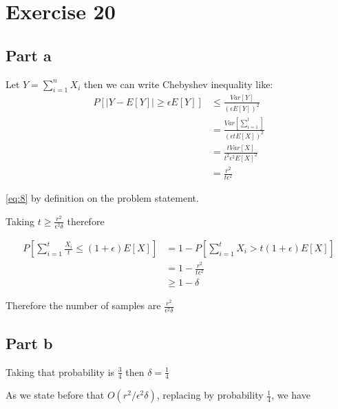 \documentclass[12pt, a4paper]{article}
\begin{document}
\section{Exercise 20}
\subsection{Part a}

Let $Y = \sum_{i=1}^nX_i$ then we can write Chebyshev inequality like:
\begin{subequations}
  \begin{align}
    P[\mid Y - E[Y] \mid \geq \epsilon E[Y]] &\leq \frac{Var[Y]}{(\epsilon E[Y])^2}\\
                                            &= \frac{Var[\sum_{i=1}^t]}{(\epsilon t E[X])^2}\\
                                            &= \frac{t Var[X]}{t^2 \epsilon^2 E[X]^2}\\
                                            &= \frac{r^2}{t \epsilon^2}\label{eq:8}
  \end{align}      

\end{subequations}


\ref{eq:8} by definition on the problem statement.

Taking $t \geq \frac{r^2}{\epsilon^2 \delta}$ therefore

\begin{subequations}
  \begin{align}
    P\left[\sum_{i=1}^t\frac{X_i}{t} \leq (1 + \epsilon) E[X]\right] &= 1 - P\left[\sum_{i=1}^tX_i > t(1 + \epsilon) E[X]\right]\\ 
                                                                     &= 1 - \frac{r^2}{t \epsilon^2}\\
                                                                     &\geq 1 - \delta \label{eq:9}
  \end{align}      
\end{subequations}

Therefore the number of samples are $\frac{r^2}{\epsilon^2 \delta}$


\subsection{Part b}
Taking that probability is $\frac{3}{4}$ then $\delta = \frac{1}{4}$

As we state before that $O(r^2/\epsilon^2 \delta)$, replacing by probability
$\frac{1}{4}$, we have
\end{document}

